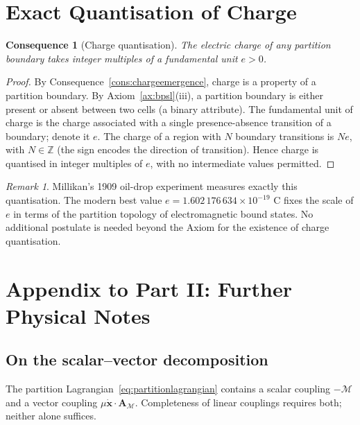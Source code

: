 \documentclass[11pt,twocolumn,a4paper]{article}
\theoremstyle{axiomstyle}
\theoremstyle{conseqstyle}
\newtheorem{consequence}{Consequence}
\theoremstyle{definition}
\theoremstyle{remark}
\newtheorem*{remark}{Remark}
\newcommand{\Depth}{\mathcal{M}}
\newcommand{\Integer}{\mathbb{Z}}
\newcommand{\Apartition}{\bm{A}_{\Depth}}
\begin{document}
\section{Exact Quantisation of Charge}
\label{sec:chargequant}

\begin{consequence}[Charge quantisation]
\label{cons:chargequantisation}
The electric charge of any partition boundary takes integer multiples of a fundamental unit $e>0$.
\end{consequence}

\begin{proof}
By Consequence~\ref{cons:chargeemergence}, charge is a property of a partition boundary. By Axiom~\ref{ax:bpsl}(iii), a partition boundary is either present or absent between two cells (a binary attribute). The fundamental unit of charge is the charge associated with a single presence-absence transition of a boundary; denote it $e$. The charge of a region with $N$ boundary transitions is $Ne$, with $N\in\Integer$ (the sign encodes the direction of transition). Hence charge is quantised in integer multiples of $e$, with no intermediate values permitted.
\end{proof}

\begin{remark}
Millikan's 1909 oil-drop experiment \citep{millikan1913} measures exactly this quantisation. The modern best value $e=1.602\,176\,634\times 10^{-19}$ C \citep{codata2018} fixes the scale of $e$ in terms of the partition topology of electromagnetic bound states. No additional postulate is needed beyond the Axiom for the existence of charge quantisation.
\end{remark}

\section*{Appendix to Part II: Further Physical Notes}

\subsection{On the scalar--vector decomposition}

The partition Lagrangian~\eqref{eq:partitionlagrangian} contains a scalar coupling $-\Depth$ and a vector coupling $\mu\dot{\mathbf{x}}\cdot\Apartition$. Completeness of linear couplings requires both; neither alone suffices.
\end{document}
